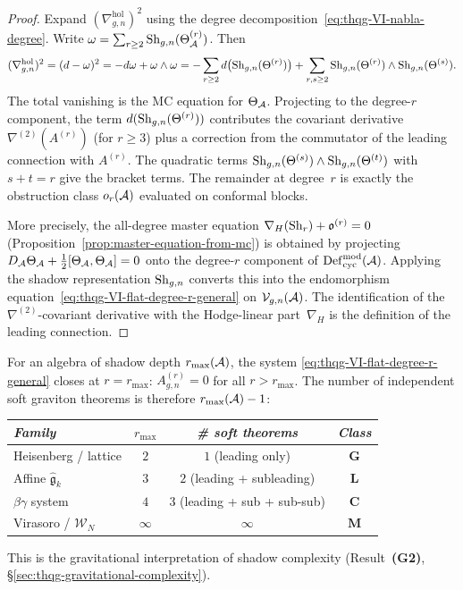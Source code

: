 \begin{proof}
Expand $(\nabla^{\mathrm{hol}}_{g,n})^2$ using the
degree decomposition~\eqref{eq:thqg-VI-nabla-degree}. Write
$\omega = \sum_{r \geq 2} \operatorname{Sh}_{g,n}(\Theta^{(r)}_{\mathcal{A}})$.
Then
\[
(\nabla^{\mathrm{hol}}_{g,n})^2
= (d - \omega)^2
= -d\omega + \omega \wedge \omega
= -\sum_{r \geq 2} d\bigl(\operatorname{Sh}_{g,n}(\Theta^{(r)})\bigr)
 + \sum_{r,s \geq 2}
 \operatorname{Sh}_{g,n}(\Theta^{(r)}) \wedge \operatorname{Sh}_{g,n}(\Theta^{(s)}).
\]
The total vanishing is the MC equation for $\Theta_{\mathcal{A}}$.
Projecting to the degree-$r$ component, the term $d(\operatorname{Sh}_{g,n}(\Theta^{(r)}))$
contributes the covariant derivative $\nabla^{(2)}(A^{(r)})$ (for
$r \geq 3$) plus a correction from the commutator of the leading
connection with $A^{(r)}$. The quadratic terms
$\operatorname{Sh}_{g,n}(\Theta^{(s)}) \wedge \operatorname{Sh}_{g,n}(\Theta^{(t)})$ with
$s + t = r$ give the bracket terms. The remainder at degree~$r$
is exactly the obstruction class $o_r(\mathcal{A})$ evaluated on conformal
blocks.

More precisely, the all-degree master equation
$\nabla_H(\operatorname{Sh}_r) + \mathfrak{o}^{(r)} = 0$
(Proposition~\ref{prop:master-equation-from-mc}) is obtained by
projecting $D_{\mathcal{A}}\Theta_{\mathcal{A}} + \tfrac{1}{2}[\Theta_{\mathcal{A}},\Theta_{\mathcal{A}}] = 0$
onto the degree-$r$ component of $\operatorname{Def}_{\mathrm{cyc}}^{\mathrm{mod}}(\mathcal{A})$.
Applying the shadow representation $\operatorname{Sh}_{g,n}$ converts this into
the endomorphism equation~\eqref{eq:thqg-VI-flat-degree-r-general}
on $\mathcal{V}_{g,n}(\mathcal{A})$. The identification of the
$\nabla^{(2)}$-covariant derivative with the Hodge-linear
part~$\nabla_H$ is the definition of the leading connection.
\end{proof}

\begin{remark}
\label{rem:thqg-VI-degree-truncation}
For an algebra of shadow depth $r_{\max}(\mathcal{A})$, the system
\eqref{eq:thqg-VI-flat-degree-r-general} closes at $r = r_{\max}$:
$A^{(r)}_{g,n} = 0$ for all $r > r_{\max}$. The number of
independent soft graviton theorems is therefore $r_{\max}(\mathcal{A}) - 1$:
\begin{center}
\small
\renewcommand{\arraystretch}{1.15}
\begin{tabular}{lccc}
\toprule
\emph{Family} &
$r_{\max}$ &
\emph{\# soft theorems} &
\emph{Class} \\
\midrule
Heisenberg / lattice &
 $2$ & $1$ (leading only) & $\mathbf{G}$ \\
Affine $\widehat{\mathfrak{g}}_k$ &
 $3$ & $2$ (leading + subleading) & $\mathbf{L}$ \\
$\beta\gamma$ system &
 $4$ & $3$ (leading + sub + sub-sub) & $\mathbf{C}$ \\
Virasoro / $\mathcal{W}_N$ &
 $\infty$ & $\infty$ & $\mathbf{M}$ \\
\bottomrule
\end{tabular}
\end{center}
This is the gravitational interpretation of shadow complexity
(Result~\textbf{(G2)}, \S\ref{sec:thqg-gravitational-complexity}).
\end{remark}

